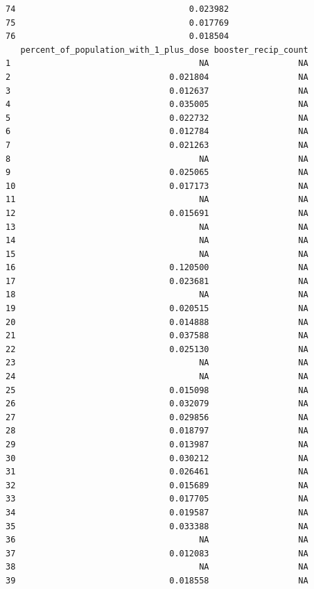 \documentclass[
  letterpaper,
  DIV=11,
  numbers=noendperiod]{scrartcl}
\begin{document}
\begin{verbatim}
74                                   0.023982
75                                   0.017769
76                                   0.018504
   percent_of_population_with_1_plus_dose booster_recip_count
1                                      NA                  NA
2                                0.021804                  NA
3                                0.012637                  NA
4                                0.035005                  NA
5                                0.022732                  NA
6                                0.012784                  NA
7                                0.021263                  NA
8                                      NA                  NA
9                                0.025065                  NA
10                               0.017173                  NA
11                                     NA                  NA
12                               0.015691                  NA
13                                     NA                  NA
14                                     NA                  NA
15                                     NA                  NA
16                               0.120500                  NA
17                               0.023681                  NA
18                                     NA                  NA
19                               0.020515                  NA
20                               0.014888                  NA
21                               0.037588                  NA
22                               0.025130                  NA
23                                     NA                  NA
24                                     NA                  NA
25                               0.015098                  NA
26                               0.032079                  NA
27                               0.029856                  NA
28                               0.018797                  NA
29                               0.013987                  NA
30                               0.030212                  NA
31                               0.026461                  NA
32                               0.015689                  NA
33                               0.017705                  NA
34                               0.019587                  NA
35                               0.033388                  NA
36                                     NA                  NA
37                               0.012083                  NA
38                                     NA                  NA
39                               0.018558                  NA

\end{verbatim}
\end{document}
